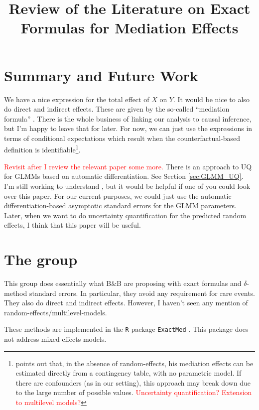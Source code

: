 \documentclass{article}
\title{Review of the Literature on Exact Formulas for Mediation Effects}
\begin{document}
\maketitle

\section{Summary and Future Work}

We have a nice expression for the total effect of $X$ on $Y$. It would be nice to also do direct and indirect effects. These are given by the so-called ``mediation formula'' \citep{Pea12}. There is the whole business of linking our analysis to causal inference, but I'm happy to leave that for later. For now, we can just use the expressions in terms of conditional expectations which result when the counterfactual-based definition is identifiable\footnote{\citet{Pea12} points out that, in the absence of random-effects, his mediation effects can be estimated directly from a contingency table, with no parametric model. If there are confounders (as in our setting), this approach may break down due to the large number of possible values. \textcolor{red}{Uncertainty quantification? Extension to multilevel models?}}.

\textcolor{red}{Revisit after I review the relevant paper some more.} There is an approach to UQ for GLMMs based on automatic differentiation. See Section \ref{sec:GLMM_UQ}. I'm still working to understand \citet{Zhe21}, but it would be helpful if one of you could look over this paper. For our current purposes, we could just use the automatic differentiation-based asymptotic standard errors for the GLMM parameters. Later, when we want to do uncertainty quantification for the predicted random effects, I think that this paper will be useful.


\section{The \citeauthor{Sam23} group}

This group does essentially what B\&B are proposing with exact formulas and $\delta$-method standard errors. In particular, they avoid any requirement for rare events. They also do direct and indirect effects. However, I haven't seen any mention of random-effects/multilevel-models.

These methods are implemented in the \texttt{R} package \texttt{ExactMed} \citep{Cau23}. This package does not address mixed-effects models.
\end{document}
